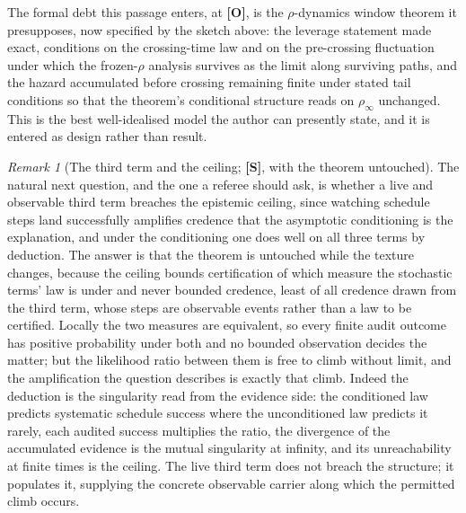 \documentclass[11pt]{article}
\theoremstyle{plain}
\theoremstyle{definition}
\theoremstyle{remark}
\newtheorem{remark}[theorem]{Remark}
\begin{document}
The formal debt this passage enters, at \textbf{[O]}, is the
$\rho$-dynamics window theorem it presupposes, now specified by the
sketch above: the leverage statement made exact, conditions on the
crossing-time law and on the pre-crossing fluctuation under which
the frozen-$\rho$ analysis survives as the limit along surviving
paths, and the hazard accumulated before crossing remaining finite
under stated tail conditions so that the theorem's conditional
structure reads on $\rho_\infty$ unchanged. This is the best
well-idealised model the author can presently state, and it is
entered as design rather than result.

\begin{remark}[The third term and the ceiling; \textbf{[S]}, with the
theorem untouched]\label{sch:rem:thirdceiling}
The natural next question, and the one a referee should ask, is
whether a live and observable third term breaches the epistemic
ceiling, since watching schedule steps land successfully amplifies
credence that the asymptotic conditioning is the explanation, and
under the conditioning one does well on all three terms by deduction.
The answer is that the theorem is untouched while the texture
changes, because the ceiling bounds certification of which measure
the stochastic terms' law is under and never bounded credence, least
of all credence drawn from the third term, whose steps are
observable events rather than a law to be certified. Locally the two measures are equivalent, so every finite
audit outcome has positive probability under both and no bounded
observation decides the matter; but the likelihood ratio between
them is free to climb without limit, and the amplification the
question describes is exactly that climb. Indeed the deduction is
the singularity read from the evidence side: the conditioned law
predicts systematic schedule success where the unconditioned law
predicts it rarely, each audited success multiplies the ratio, the
divergence of the accumulated evidence is the mutual singularity at
infinity, and its unreachability at finite times is the ceiling. The
live third term does not breach the structure; it populates it,
supplying the concrete observable carrier along which the permitted
climb occurs.


\end{remark}
\end{document}

